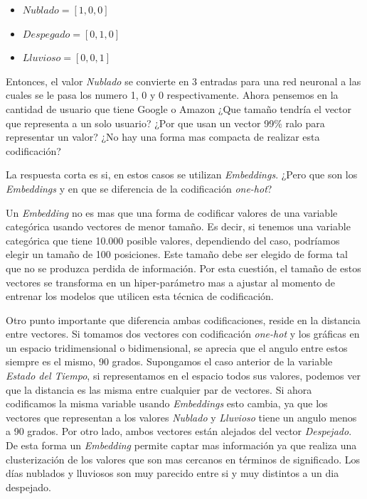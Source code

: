 \documentclass[11pt,a4paper,twoside]{thesis}
\begin{document}
\begin{itemize}
	\item $Nublado    = [1, 0, 0]$
	\item $Despegado  = [0, 1, 0]$
	\item $Lluvioso   = [0, 0, 1]$
\end{itemize}

Entonces, el valor \textit{Nublado} se convierte en 3 entradas para una red
neuronal a las cuales se le pasa los numero 1, 0 y 0 respectivamente. Ahora
pensemos en la cantidad de usuario que tiene Google o Amazon ¿Que tamaño
tendría el vector que representa a un solo usuario? ¿Por que usan un vector
99\% ralo para representar un valor? ¿No hay una forma mas compacta de realizar
esta codificación?

La respuesta corta es si, en estos casos se utilizan \textit{Embeddings}. ¿Pero
que son los \textit{Embeddings} y en que se diferencia de la codificación
\textit{one-hot}?

Un \textit{Embedding} no es mas que una forma de codificar valores de una
variable categórica usando vectores de menor tamaño. Es decir, si tenemos una
variable categórica que tiene 10.000 posible valores, dependiendo del caso,
podríamos elegir un tamaño de 100 posiciones. Este tamaño debe ser elegido de
forma tal que no se produzca perdida de información. Por esta cuestión, el
tamaño de estos vectores se transforma en un hiper-parámetro mas a ajustar al
momento de entrenar los modelos que utilicen esta técnica de codificación.

Otro punto importante que diferencia ambas codificaciones, reside en la
distancia entre vectores. Si tomamos dos vectores con codificación
\textit{one-hot} y los gráficas en un espacio tridimensional o bidimensional,
se aprecia que el angulo entre estos siempre es el mismo, 90 grados. Supongamos
el caso anterior de la variable \textit{Estado del Tiempo}, si representamos en
el espacio todos sus valores, podemos ver que la distancia es las misma entre
cualquier par de vectores. Si ahora codificamos la misma variable usando
\textit{Embeddings} esto cambia, ya que los vectores que representan a los
valores \textit{Nublado} y \textit{Lluvioso} tiene un angulo menos a 90 grados.
Por otro lado, ambos vectores están alejados del vector \textit{Despejado}. De
esta forma un \textit{Embedding} permite captar mas información ya que realiza
una clusterización de los valores que son mas cercanos en términos de
significado. Los días nublados y lluviosos son muy parecido entre si y muy
distintos a un dia despejado.
\end{document}
